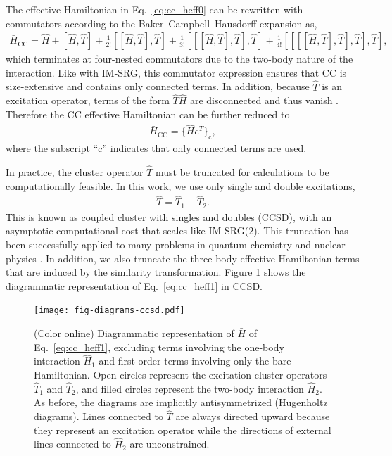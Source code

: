 The effective Hamiltonian in Eq.\ \eqref{eq:cc_heff0} can be rewritten with commutators according to the Baker--Campbell--Hausdorff expansion as,
\begin{align*}
  \bar{H}_{\mathrm{CC}} = \hat{H} + [\hat{H}, \hat{T}] + \frac{1}{2!} [[\hat{H}, \hat{T} ], \hat{T}] + \frac{1}{3!} [[[\hat{H}, \hat{T}], \hat{T}], \hat{T}] + \frac{1}{4!} [[[[\hat{H}, \hat{T}], \hat{T}], \hat{T}], \hat{T}],
\end{align*}
which terminates at four-nested commutators due to the two-body nature of the interaction.  Like with IM-SRG, this commutator expression ensures that CC is size-extensive and contains only connected terms.  In addition, because $\hat{T}$ is an excitation operator, terms of the form $\hat{T} \hat{H}$ are disconnected and thus vanish \cite{shavitt2009many}.  Therefore the CC effective Hamiltonian can be further reduced to
\begin{align} \label{eq:cc_heff1}
  \bar{H}_{\mathrm{CC}} = \bigl\{\hat{H}e^{\hat{T}}\bigr\}_{\mathrm{c}},
\end{align}
where the subscript ``$\mathrm{c}$'' indicates that only connected terms are used.

In practice, the cluster operator $\hat{T}$ must be truncated for calculations to be computationally feasible.  In this work, we use only single and double excitations,
\begin{align*}
  \hat{T} = \hat{T}_1 + \hat{T}_2.
\end{align*}
This is known as coupled cluster with singles and doubles (CCSD), with an asymptotic computational cost that scales like IM-SRG(2).  This truncation has been successfully applied to many problems in quantum chemistry \cite{RevModPhys.79.291} and nuclear physics \cite{2014RPPh...77i6302H}.  In addition, we also truncate the three-body effective Hamiltonian terms that are induced by the similarity transformation.  Figure \ref{fig:diagrams-ccsd} shows the diagrammatic representation of Eq.\ \eqref{eq:cc_heff1} in CCSD.

\begin{figure}
  \texttt{[image: fig-diagrams-ccsd.pdf]}
  \caption{(Color online) Diagrammatic representation of $\bar{H}$ of Eq.\ \eqref{eq:cc_heff1}, excluding terms involving the one-body interaction $\hat{H}_1$ and first-order terms involving only the bare Hamiltonian. Open circles represent the excitation cluster operators $\hat{T}_1$ and $\hat{T}_2$, and filled circles represent the two-body interaction $\hat{H}_2$.  As before, the diagrams are implicitly antisymmetrized (Hugenholtz diagrams).  Lines connected to $\hat{T}$ are always directed upward because they represent an excitation operator while the directions of external lines connected to $\hat{H}_2$ are unconstrained. }
  \label{fig:diagrams-ccsd}
\end{figure}

